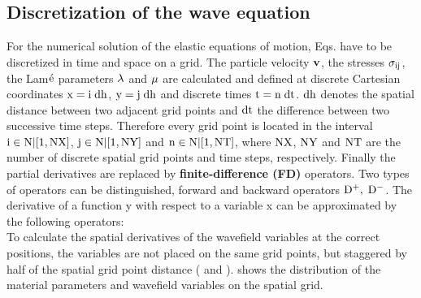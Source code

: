 \subsection{Discretization of the wave equation}
For the numerical solution of the elastic equations of motion, Eqs.  have to be discretized in time and space on a grid. The
particle velocity $\rm{\mathbf{v}}$, the stresses $\rm{\sigma_{ij}}$, the Lam$\acute{\rm e}$ parameters $\rm{\lambda}$ and $\rm{\mu}$ are calculated and defined at discrete Cartesian coordinates $\rm{x=i\; dh}$, $\rm{y=j\; dh}$ and discrete times $\rm{t=n\; dt}$. 
$\rm{dh}$ denotes the spatial distance between two adjacent grid points and $\rm{dt}$ the difference between two successive time steps. Therefore every grid point is located in the interval  $\rm{i \in N | [1,NX]}$, $\rm{j \in N | [1,NY]}$ and $\rm{n \in N | [1,NT]}$, where
$\rm{NX}$, $\rm{NY}$ and $\rm{NT}$ are the number of discrete spatial grid points and time steps, respectively. Finally the partial derivatives are replaced by {\bf{finite-difference} (FD)} operators. 
Two types of operators can be distinguished, forward and backward operators $\rm{D^+,\;D^-}$. The derivative of a function y with respect to a variable x can be approximated by the following operators:  
\\
To calculate the spatial derivatives of the wavefield variables at the correct positions, the variables are not placed on the same 
grid points, but staggered by half of the spatial grid point distance (\cite{virieux:86} and \cite{levander:88}). 
 shows the distribution of the material parameters and wavefield variables on the spatial grid. 

 

